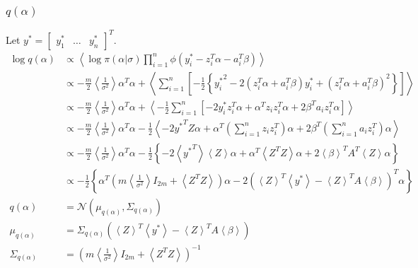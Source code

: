 \documentclass[11pt]{article}
\begin{document}
\subsubsection{$q\left(\alpha\right)$}
Let $y^{*} = \begin{bmatrix}y_{1}^{*} & \ldots & y_{n}^{*}\end{bmatrix}^{T}$.
\begin{align*}
  \log q\left(\alpha\right) &\propto \left\langle \log \pi\left(\alpha|\sigma\right)\prod_{i=1}^{n}\phi\left(y_{i}^{*}-z_{i}^{T}\alpha - a_{i}^{T}\beta\right)\right\rangle\\
  &\propto -\frac{m}{2}\left\langle \frac{1}{\sigma^{2}}\right\rangle\alpha^{T}\alpha +\left\langle \sum_{i=1}^{n}\left[-\frac{1}{2}\left\{{y_{i}^{*}}^{2} -2\left(z_{i}^{T}\alpha + a_{i}^{T}\beta\right)y_{i}^{*} + \left(z_{i}^{T}\alpha + a_{i}^{T}\beta\right)^{2}\right\}\right]\right\rangle\\
  &\propto -\frac{m}{2}\left\langle \frac{1}{\sigma^{2}} \right\rangle \alpha^{T}\alpha + \left\langle -\frac{1}{2}\sum_{i=1}^{n}\left[-2y_{i}^{*}z_{i}^{T}\alpha +\alpha^{T}z_{i}z_{i}^{T}\alpha +2\beta^{T}a_{i}z_{i}^{T}\alpha \right]\right\rangle\\
  &\propto -\frac{m}{2}\left\langle \frac{1}{\sigma^{2}}\right\rangle \alpha^{T}\alpha -\frac{1}{2}\left\langle -2{y^{*}}^{T}Z\alpha + \alpha^{T}\left(\sum_{i=1}^{n}z_{i}z_{i}^{T}\right)\alpha + 2\beta^{T}\left(\sum_{i=1}^{n}a_{i}z_{i}^{T}\right)\alpha\right\rangle \\
  &\propto -\frac{m}{2}\left\langle \frac{1}{\sigma^{2}}\right\rangle \alpha^{T}\alpha -\frac{1}{2}\left\{-2\left\langle {y^{*}}^{T}\right\rangle \left\langle Z\right\rangle \alpha + \alpha^{T}\left\langle Z^{T}Z \right\rangle \alpha + 2\left\langle\beta\right\rangle^{T} A^{T}\left\langle Z\right\rangle \alpha \right\}\\
  &\propto -\frac{1}{2}\left\{\alpha^{T}\left(m\left\langle \frac{1}{\sigma^{2}}\right\rangle I_{2m} + \left\langle Z^{T}Z \right\rangle\right)\alpha-2\left(\left\langle Z\right\rangle^{T}\left\langle y^{*}\right\rangle -\left\langle Z \right\rangle^{T}A\left\langle \beta\right\rangle \right)^{T}\alpha \right\}\\
  q\left(\alpha\right) &= \mathcal{N}\left(\mu_{q\left(\alpha\right)}, \Sigma_{q\left(\alpha\right)}\right)\\
  \mu_{q\left(\alpha\right)} &= \Sigma_{q\left(\alpha\right)}\left(\left\langle Z\right\rangle^{T}\left\langle y^{*}\right\rangle -\left\langle Z \right\rangle^{T}A\left\langle \beta\right\rangle \right)\\
  \Sigma_{q\left(\alpha\right)} &= \left(m\left\langle \frac{1}{\sigma^{2}}\right\rangle I_{2m} + \left\langle Z^{T}Z \right\rangle\right)^{-1}
\end{align*}
\end{document}
